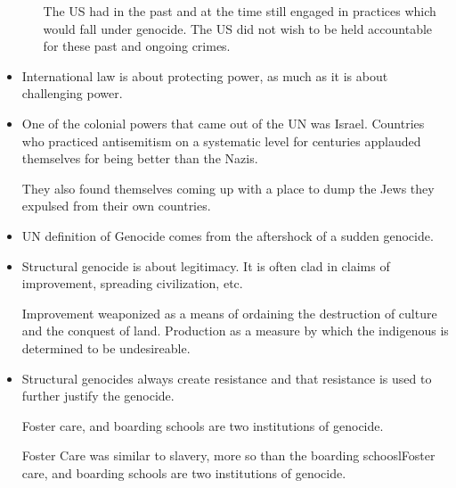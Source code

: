 \documentclass{report}
\begin{document}
\begin{itemize}
\begin{enumerate}
\begin{mdframed}
                    \vspace{15}

                    The US had in the past and at the
                    time still engaged in practices
                    which would fall under genocide.
                    The US did not wish to be held
                    accountable for these past and
                    ongoing crimes.
                \end{mdframed}
        \end{enumerate}
    \item International law is about protecting power,
        as much as it is about challenging power.

    \item One of the colonial powers that came
        out of the UN was Israel. Countries who
        practiced antisemitism on a systematic level
        for centuries applauded themselves for being
        better than the Nazis.

        They also found themselves coming up with a
        place to dump the Jews they expulsed from their
        own countries.

    \item UN definition of Genocide comes from the
        aftershock of a sudden genocide.

    \item Structural genocide is about legitimacy. It
        is often clad in claims of improvement,
        spreading civilization, etc.

        Improvement weaponized as a means of ordaining
        the destruction of culture and the conquest
        of land. Production as a measure by which
        the indigenous is determined to be undesireable.

        \pagebreak
    \item Structural genocides always create resistance
        and that resistance is used to further
        justify the genocide.

        \begin{mdframed}
            Foster care, and boarding schools are
            two institutions of genocide.

            Foster Care was similar to slavery,
            more so than the boarding schooslFoster care, and boarding schools are
            two institutions of genocide.


\end{mdframed}
\end{itemize}
\end{document}
